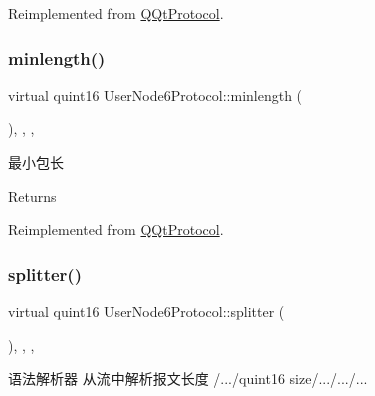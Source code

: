 Reimplemented from \mbox{\hyperlink{class_q_qt_protocol_af41bc3116abbbcfc9af45e151a253ff7}{Q\+Qt\+Protocol}}.

\mbox{\label{class_user_node6_protocol_acec32f9dbc13eefa0d51f62eda4f9581}} 
\subsubsection{\texorpdfstring{minlength()}{minlength()}}
{\footnotesize\ttfamily virtual quint16 User\+Node6\+Protocol\+::minlength (\begin{DoxyParamCaption}{ }\end{DoxyParamCaption})\hspace{0.3cm}{\ttfamily [inline]}, {\ttfamily [override]}, {\ttfamily [protected]}, {\ttfamily [virtual]}}



最小包长 

\begin{DoxyReturn}{Returns}

\end{DoxyReturn}


Reimplemented from \mbox{\hyperlink{class_q_qt_protocol_a2b00f53d3dd0eed817eeecff422891f3}{Q\+Qt\+Protocol}}.

\mbox{\label{class_user_node6_protocol_a1f03c2a595c4838d1075000aa51c8c3d}} 
\subsubsection{\texorpdfstring{splitter()}{splitter()}}
{\footnotesize\ttfamily virtual quint16 User\+Node6\+Protocol\+::splitter (\begin{DoxyParamCaption}\item[{const Q\+Byte\+Array \&}]{ }\end{DoxyParamCaption})\hspace{0.3cm}{\ttfamily [inline]}, {\ttfamily [override]}, {\ttfamily [protected]}, {\ttfamily [virtual]}}



语法解析器 从流中解析报文长度 /.../quint16 size/.../.../... 


